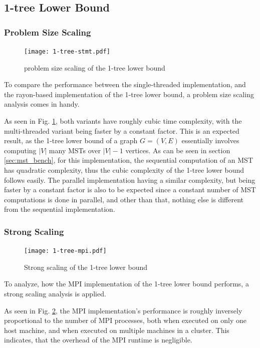 \subsection{1-tree Lower Bound}
\label{sec:1_tree_bench}

\subsubsection{Problem Size Scaling}

\begin{figure}[H]
\texttt{[image: 1-tree-stmt.pdf]}
\caption{problem size scaling of the 1-tree lower bound}
\label{fig:weak_scaling_1_tree}
\end{figure}

To compare the performance between the single-threaded implementation,
and the rayon-based implementation of the 1-tree lower bound,
a problem size scaling analysis comes in handy.

As seen in Fig. \ref{fig:weak_scaling_1_tree},
both variants have roughly cubic time complexity,
with the multi-threaded variant being faster by a
constant factor.
This is an expected result, as the 1-tree lower bound of a graph $G = (V,E)$ essentially
involves computing $|V|$ many \ac{MST}s over $|V|-1$ vertices.
As can be seen in section \ref{sec:mst_bench}, for this implementation, the sequential computation of an \ac{MST}
has quadratic complexity, thus the cubic complexity of the 1-tree lower bound
follows easily.
The parallel implementation having a similar complexity, but being faster by a constant factor is also to be
expected since a constant number of \ac{MST} computations is done in parallel,
and other than that, nothing else is different from the sequential implementation.

\subsubsection{Strong Scaling}

\begin{figure}[H]
\texttt{[image: 1-tree-mpi.pdf]}
\caption{Strong scaling of the 1-tree lower bound}
\label{fig:strong_scaling_1_tree}
\end{figure}


To analyze, how the \ac{MPI} implementation
of the 1-tree lower bound
performs, a strong scaling analysis is applied.

As seen in Fig. \ref{fig:strong_scaling_1_tree},
the MPI implementation's performance is roughly
inversely proportional to the number of \ac{MPI} processes,
both when executed on only one host machine,
and when executed on multiple machines in a cluster.
This indicates, that the overhead of the \ac{MPI} runtime is negligible.


